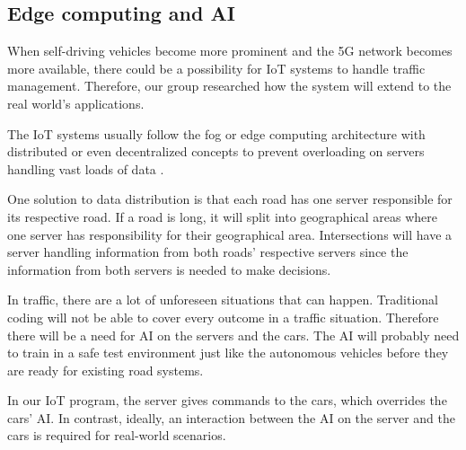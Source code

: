 \subsection{Edge computing and AI}
When self-driving vehicles become more prominent and the 5G network becomes more available, there could be a possibility for IoT systems to handle traffic management. Therefore, our group researched how the system will extend to the real world's applications. 

The IoT systems usually follow the fog or edge computing architecture with distributed or even decentralized concepts to prevent overloading on servers handling vast loads of data \parencite[pp 149]{iot_platforms}. 

One solution to data distribution is that each road has one server responsible for its respective road. If a road is long, it will split into geographical areas where one server has responsibility for their geographical area. Intersections will have a server handling information from both roads' respective servers since the information from both servers is needed to make decisions.

In traffic, there are a lot of unforeseen situations that can happen. Traditional coding will not be able to cover every outcome in a traffic situation. Therefore there will be a need for AI on the servers and the cars. The AI will probably need to train in a safe test environment just like the autonomous vehicles before they are ready for existing road systems.

In our IoT program, the server gives commands to the cars, which overrides the cars' AI. In contrast, ideally, an interaction between the AI on the server and the cars is required for real-world scenarios.

